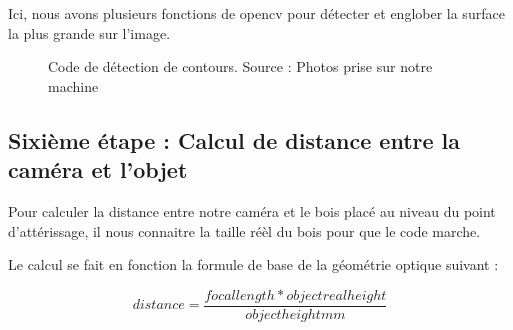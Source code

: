  Ici, nous avons plusieurs fonctions de opencv pour détecter et englober la surface la plus grande sur l'image.
 
 \begin{figure}[H]%
 	\center%
 	\setlength{\fboxsep}{5pt}%
 	\setlength{\fboxrule}{0.5pt}%
 	\caption[Code de détection de contours]{Code de détection de contours. Source : Photos prise sur notre machine}
 	\label{fig:Code de détection de contours}
 \end{figure}
 
 \subsection{Sixième étape : Calcul de distance entre la caméra et l'objet}
 
 Pour calculer la distance entre notre caméra et le bois placé au niveau du point d'attérissage, il nous connaitre la taille réèl du bois pour que le code marche. 
 
 Le calcul se fait en fonction la formule de base de la géométrie optique suivant : 
 
 \[
  distance 
  =
 \frac{focallength * objectrealheight}{objectheightmm}
 \]

